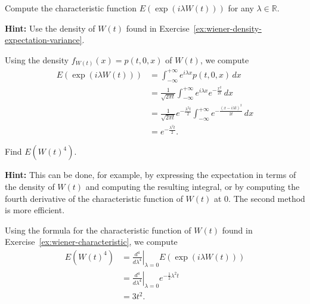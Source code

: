 \begin{Exercise}
\label{ex:wiener-characteristic}
Compute the characteristic function $E(\exp(i\lambda W(t)))$ for any $\lambda \in \mathbb{R}$.

\noindent\textbf{Hint:} Use the density of $W(t)$ found in Exercise~\ref{ex:wiener-density-expectation-variance}.
\end{Exercise}

\begin{Solution}
Using the density $f_{W(t)}(x) = p(t,0,x)$ of $W(t)$, we compute
\begin{equation}
\begin{aligned}
E(\exp(i\lambda W(t))) &= \int_{-\infty}^{+\infty} e^{i\lambda x} p(t, 0, x) \, dx \\
&= \frac{1}{\sqrt{2\pi t}} \int_{-\infty}^{+\infty} e^{i\lambda x} e^{-\frac{x^2}{2t}} \, dx \\
&= \frac{1}{\sqrt{2\pi t}} e^{-\frac{\lambda^2 t}{2}} \int_{-\infty}^{+\infty} e^{-\frac{(x - i\lambda t)^2}{2t}} \, dx \\
&= e^{-\frac{\lambda^2 t}{2}}.
\end{aligned}
\end{equation}
\end{Solution}

\begin{Exercise}
\label{ex:wiener-fourth-moment}
Find $E(W(t)^4)$.

\noindent\textbf{Hint:} This can be done, for example, by expressing the expectation in terms of the density of $W(t)$ and computing the resulting integral, or by computing the fourth derivative of the characteristic function of $W(t)$ at 0. The second method is more efficient.
\end{Exercise}

\begin{Solution}
Using the formula for the characteristic function of $W(t)$ found in Exercise~\ref{ex:wiener-characteristic}, we compute
\begin{equation}
\begin{aligned}
E(W(t)^4) &= \left.\frac{d^4}{d\lambda^4}\right|_{\lambda=0} E(\exp(i\lambda W(t))) \\
&= \left.\frac{d^4}{d\lambda^4}\right|_{\lambda=0} e^{-\frac{1}{2}\lambda^2 t} \\
&= 3t^2.
\end{aligned}
\end{equation}
\end{Solution}


